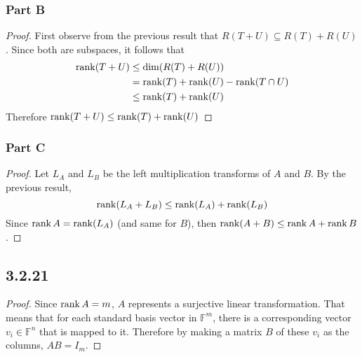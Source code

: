 \documentclass[12pt,titlepage]{extarticle}
\begin{document}
\subsubsection*{Part B}
\begin{proof}
    First observe from the previous result that $R(T + U) \subseteq R(T) + R(U)$. Since both are subspaces, it follows that 
    \begin{align*}
        \rank (T + U) &\leq \dim(R(T) + R(U)) \\
        &= \rank(T) + \rank(U) - \rank(T \cap U) \\
        &\leq \rank(T) + \rank(U)
    \end{align*}
    Therefore $\rank(T+U) \leq \rank(T) + \rank(U)$
\end{proof}

\subsubsection*{Part C}
\begin{proof}
    Let $L_A$ and $L_B$ be the left multiplication transforms of $A$ and $B$. By the previous result,
    \[
        \rank(L_A + L_B) \leq \rank(L_A) + \rank(L_B)
    \]
    Since $\rank A = \rank (L_A)$ (and same for $B$), then $\rank(A + B) \leq \rank A + \rank B$.
\end{proof}

\subsection*{3.2.21}
\begin{proof}
    Since $\rank A = m$, $A$ represents a surjective linear transformation. That means that for each standard basis vector in $\mathbb{F}^m$, there is a corresponding vector $v_i \in \mathbb{F}^n$ that is mapped to it. Therefore by making a matrix $B$ of these $v_i$ as the columns, $AB = I_m$.
\end{proof}
\end{document}
